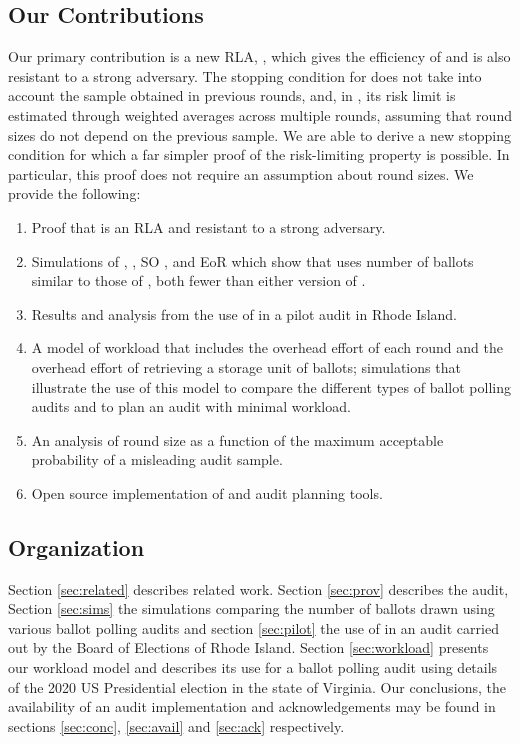 \subsection{Our Contributions}
Our primary contribution is a new RLA, \Providence, which gives the efficiency of \Minerva and is also resistant to a strong adversary. The stopping condition for \Minerva does not take into account the sample obtained in previous rounds, and, in \cite{usenix_minerva}, its risk limit is estimated through weighted averages across multiple rounds, assuming that round sizes do not depend on the previous sample. We are able to derive a new stopping condition for which a far simpler proof of the risk-limiting property is possible. In particular, this proof does not require an assumption about round sizes. We provide the following:
\begin{enumerate}
\item Proof that \Providence is an RLA and resistant to a strong adversary.
\item Simulations of \Providence, \Minerva, SO \BRAVO, and EoR \BRAVO which show that \Providence uses number of ballots similar to those of \Minerva, both fewer than either version of \BRAVO.
\item Results and analysis from the use of \Providence in a pilot audit in Rhode Island.
\item A model of workload that includes the overhead effort of each round and the overhead effort of retrieving a storage unit of ballots; simulations that illustrate the use of this model to compare the different types of ballot polling audits and to plan an audit with minimal workload.
\item An analysis of round size as a function of the maximum acceptable probability of a misleading audit sample.
\item Open source implementation of \Providence and audit planning tools. 
\end{enumerate}


\subsection{Organization} 
Section \ref{sec:related} describes related work. Section \ref{sec:prov} describes the \Providence audit, Section \ref{sec:sims} the simulations comparing the number of ballots drawn using various ballot polling audits and section \ref{sec:pilot} the use of \Providence in an audit carried out by the Board of Elections of Rhode Island. Section \ref{sec:workload} presents our workload model and describes its use for a ballot polling audit using details of the 2020 US Presidential election in the state of Virginia. Our conclusions, the availability of an audit implementation and acknowledgements may be found in sections \ref{sec:conc}, \ref{sec:avail} and \ref{sec:ack} respectively. 

